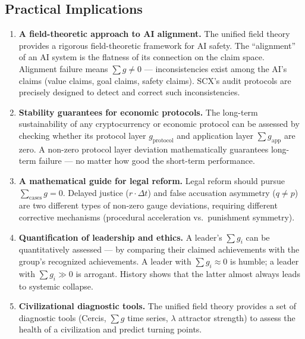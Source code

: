 \documentclass[12pt,a4paper]{article}
\theoremstyle{plain}
\theoremstyle{definition}
\begin{document}
\subsection{Practical Implications}

\begin{enumerate}[label=\textbf{Application \arabic*:}]

    \item \textbf{A field-theoretic approach to AI alignment.} The unified field theory provides
    a rigorous field-theoretic framework for AI safety.
    The ``alignment'' of an AI system is the flatness of its connection on the claim space.
    Alignment failure means $\sum g \neq 0$ — inconsistencies exist among the AI's claims (value claims, goal claims,
    safety claims). SCX's audit protocols are precisely designed to detect and correct
    such inconsistencies.

    \item \textbf{Stability guarantees for economic protocols.} The long-term sustainability of any cryptocurrency or economic protocol
    can be assessed by checking whether its protocol layer $g_{\text{protocol}}$ and application layer
    $\sum g_{\text{app}}$ are zero. A non-zero protocol layer deviation mathematically
    guarantees long-term failure — no matter how good the short-term performance.

    \item \textbf{A mathematical guide for legal reform.} Legal reform should pursue $\sum_{\text{cases}} g = 0$.
    Delayed justice ($r \cdot \Delta t$) and false accusation asymmetry ($q \neq p$) are two
    different types of non-zero gauge deviations, requiring different corrective mechanisms (procedural acceleration vs.\ punishment symmetry).

    \item \textbf{Quantification of leadership and ethics.} A leader's $\sum g_i$ can be
    quantitatively assessed — by comparing their claimed achievements with the group's recognized achievements.
    A leader with $\sum g_i \approx 0$ is humble; a leader with $\sum g_i \gg 0$
    is arrogant. History shows that the latter almost always leads to systemic collapse.

    \item \textbf{Civilizational diagnostic tools.} The unified field theory provides a set of diagnostic tools
    (Cercis, $\sum g$ time series, $\lambda$ attractor strength) to assess
    the health of a civilization and predict turning points.

\end{enumerate}
\end{document}
